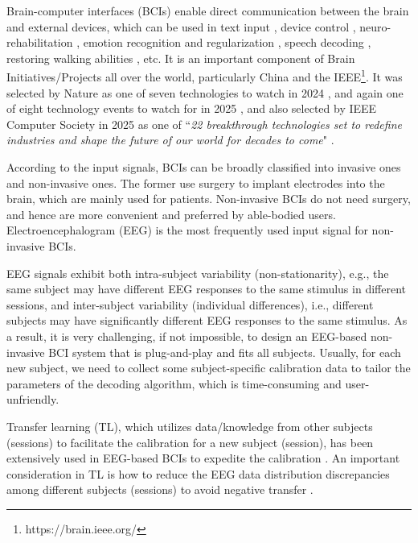 \documentclass[journal]{IEEEtran}
\begin{document}
Brain-computer interfaces (BCIs) enable direct communication between the brain and external devices, which can be used in text input \cite{Nakanishi2020}, device control \cite{Leeb2007}, neuro-rehabilitation \cite{Mane2020}, emotion recognition and regularization \cite{drwuPIEEE2023}, speech decoding \cite{Moses2021}, restoring walking abilities \cite{Lorach2023}, etc. It is an important component of Brain Initiatives/Projects all over the world, particularly China \cite{Liu2023} and the IEEE\footnote{https://brain.ieee.org/}. It was selected by Nature as one of seven technologies to watch in 2024 \cite{Eisenstein2024}, and again one of eight technology events to watch for in 2025 \cite{Naddaf2025}, and also selected by IEEE Computer Society in 2025 as one of ``\emph{22 breakthrough technologies set to redefine industries and shape the future of our world for decades to come}" \cite{Milojicic2025}.

According to the input signals, BCIs can be broadly classified into invasive ones and non-invasive ones. The former use surgery to implant electrodes into the brain, which are mainly used for patients. Non-invasive BCIs do not need surgery, and hence are more convenient and preferred by able-bodied users. Electroencephalogram (EEG) is the most frequently used input signal for non-invasive BCIs.

EEG signals exhibit both intra-subject variability (non-stationarity), e.g., the same subject may have different EEG responses to the same stimulus in different sessions, and inter-subject variability (individual differences), i.e., different subjects may have significantly different EEG responses to the same stimulus. As a result, it is very challenging, if not impossible, to design an EEG-based non-invasive BCI system that is plug-and-play and fits all subjects. Usually, for each new subject, we need to collect some subject-specific calibration data to tailor the parameters of the decoding algorithm, which is time-consuming and user-unfriendly.

Transfer learning (TL), which utilizes data/knowledge from other subjects (sessions) to facilitate the calibration for a new subject (session), has been extensively used in EEG-based BCIs to expedite the calibration \cite{drwuTLBCI2022}. An important consideration in TL is how to reduce the EEG data distribution discrepancies among different subjects (sessions) to avoid negative transfer \cite{drwuNTL2023}.
\end{document}
